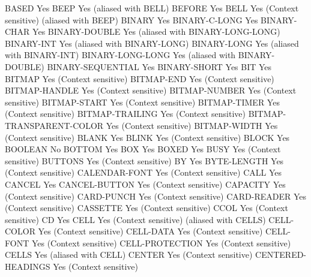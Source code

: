 BASED                           Yes
BEEP                            Yes (aliased with BELL)
BEFORE                          Yes
BELL                            Yes (Context sensitive) (aliased with BEEP)
BINARY                          Yes
BINARY-C-LONG                   Yes
BINARY-CHAR                     Yes
BINARY-DOUBLE                   Yes (aliased with BINARY-LONG-LONG)
BINARY-INT                      Yes (aliased with BINARY-LONG)
BINARY-LONG                     Yes (aliased with BINARY-INT)
BINARY-LONG-LONG                Yes (aliased with BINARY-DOUBLE)
BINARY-SEQUENTIAL               Yes
BINARY-SHORT                    Yes
BIT                             Yes
BITMAP                          Yes (Context sensitive)
BITMAP-END                      Yes (Context sensitive)
BITMAP-HANDLE                   Yes (Context sensitive)
BITMAP-NUMBER                   Yes (Context sensitive)
BITMAP-START                    Yes (Context sensitive)
BITMAP-TIMER                    Yes (Context sensitive)
BITMAP-TRAILING                 Yes (Context sensitive)
BITMAP-TRANSPARENT-COLOR        Yes (Context sensitive)
BITMAP-WIDTH                    Yes (Context sensitive)
BLANK                           Yes
BLINK                           Yes (Context sensitive)
BLOCK                           Yes
BOOLEAN                         No
BOTTOM                          Yes
BOX                             Yes
BOXED                           Yes
BUSY                            Yes (Context sensitive)
BUTTONS                         Yes (Context sensitive)
BY                              Yes
BYTE-LENGTH                     Yes (Context sensitive)
CALENDAR-FONT                   Yes (Context sensitive)
CALL                            Yes
CANCEL                          Yes
CANCEL-BUTTON                   Yes (Context sensitive)
CAPACITY                        Yes (Context sensitive)
CARD-PUNCH                      Yes (Context sensitive)
CARD-READER                     Yes (Context sensitive)
CASSETTE                        Yes (Context sensitive)
CCOL                            Yes (Context sensitive)
CD                              Yes
CELL                            Yes (Context sensitive) (aliased with CELLS)
CELL-COLOR                      Yes (Context sensitive)
CELL-DATA                       Yes (Context sensitive)
CELL-FONT                       Yes (Context sensitive)
CELL-PROTECTION                 Yes (Context sensitive)
CELLS                           Yes (aliased with CELL)
CENTER                          Yes (Context sensitive)
CENTERED-HEADINGS               Yes (Context sensitive)
